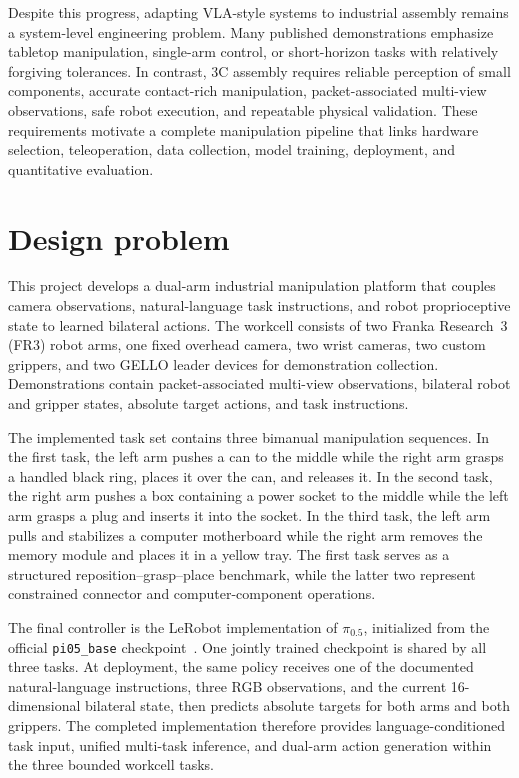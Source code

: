 Despite this progress, adapting VLA-style systems to industrial assembly remains a system-level engineering problem. Many published demonstrations emphasize tabletop manipulation, single-arm control, or short-horizon tasks with relatively forgiving tolerances. In contrast, 3C assembly requires reliable perception of small components, accurate contact-rich manipulation, packet-associated multi-view observations, safe robot execution, and repeatable physical validation. These requirements motivate a complete manipulation pipeline that links hardware selection, teleoperation, data collection, model training, deployment, and quantitative evaluation.

\section{Design problem}

This project develops a dual-arm industrial manipulation platform that couples camera observations, natural-language task instructions, and robot proprioceptive state to learned bilateral actions. The workcell consists of two Franka Research~3 (FR3) robot arms, one fixed overhead camera, two wrist cameras, two custom grippers, and two GELLO leader devices for demonstration collection. Demonstrations contain packet-associated multi-view observations, bilateral robot and gripper states, absolute target actions, and task instructions.

The implemented task set contains three bimanual manipulation sequences. In the first task, the left arm pushes a can to the middle while the right arm grasps a handled black ring, places it over the can, and releases it. In the second task, the right arm pushes a box containing a power socket to the middle while the left arm grasps a plug and inserts it into the socket. In the third task, the left arm pulls and stabilizes a computer motherboard while the right arm removes the memory module and places it in a yellow tray. The first task serves as a structured reposition--grasp--place benchmark, while the latter two represent constrained connector and computer-component operations.

The final controller is the LeRobot implementation of $\pi_{0.5}$, initialized from the official \texttt{pi05\_base} checkpoint~\cite{pi05,openpi,lerobot,lerobotpi05}. One jointly trained checkpoint is shared by all three tasks. At deployment, the same policy receives one of the documented natural-language instructions, three RGB observations, and the current 16-dimensional bilateral state, then predicts absolute targets for both arms and both grippers. The completed implementation therefore provides language-conditioned task input, unified multi-task inference, and dual-arm action generation within the three bounded workcell tasks. 

